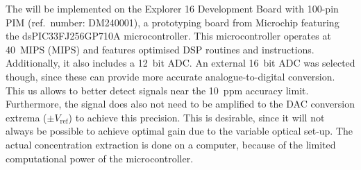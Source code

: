 \documentclass[\home/main.tex]{subfiles}
\begin{document}
  The  will be implemented on the Explorer 16 Development Board with 100-pin \acrshort{PIM} (ref.\ number: DM240001), a prototyping board from Microchip featuring the dsPIC33FJ256GP710A microcontroller. This microcontroller operates at \SI{40}{MIPS} (\acrlong{MIPS}) and features optimised \acrshort{DSP} routines and instructions. Additionally, it also includes a \SI{12}{bit} \acrshort{ADC}. An external \SI{16}{bit} \acrshort{ADC} was selected though, since these can provide more accurate analogue-to-digital conversion. This us allows to better detect signals near the \SI{10}{ppm} accuracy limit. Furthermore, the signal does also not need to be amplified to the \acrshort{DAC} conversion extrema ($\pm V_\text{ref}$) to achieve this precision. This is desirable, since it will not always be possible to achieve optimal gain due to the variable optical set-up. The actual concentration extraction is done on a computer, because of the limited computational power of the microcontroller.
  
\end{document}
